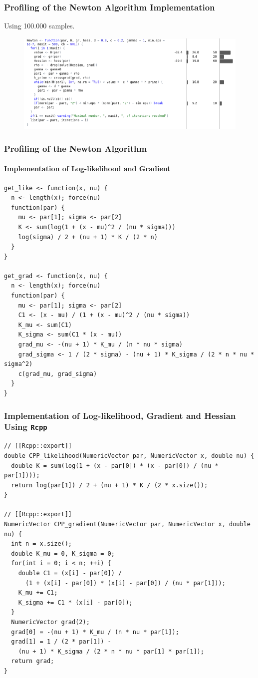 \documentclass[aspectratio=169]{beamer}
\begin{document}
\begin{frame}
    \frametitle{Profiling of the Newton Algorithm Implementation}
    Using 100.000 samples.
    \begin{figure}
        \centering
        \includegraphics[scale = 0.4]{figure/NewtonProfile.png}
    \end{figure}
\end{frame}
\begin{frame}[fragile]
    \frametitle{Profiling of the Newton Algorithm}
    \framesubtitle{Implementation of Log-likelihood and Gradient}
\begin{verbatim}
get_like <- function(x, nu) {
  n <- length(x); force(nu)
  function(par) {
    mu <- par[1]; sigma <- par[2]
    K <- sum(log(1 + (x - mu)^2 / (nu * sigma)))
    log(sigma) / 2 + (nu + 1) * K / (2 * n)
  }
}

get_grad <- function(x, nu) {
  n <- length(x); force(nu)
  function(par) {
    mu <- par[1]; sigma <- par[2]
    C1 <- (x - mu) / (1 + (x - mu)^2 / (nu * sigma))
    K_mu <- sum(C1)
    K_sigma <- sum(C1 * (x - mu))
    grad_mu <- -(nu + 1) * K_mu / (n * nu * sigma)
    grad_sigma <- 1 / (2 * sigma) - (nu + 1) * K_sigma / (2 * n * nu * sigma^2)
    c(grad_mu, grad_sigma)
  }
}
\end{verbatim}
\end{frame}
\begin{frame}[fragile]
    \frametitle{Implementation of Log-likelihood, Gradient and Hessian Using \texttt{Rcpp}}
\begin{verbatim}
// [[Rcpp::export]]
double CPP_likelihood(NumericVector par, NumericVector x, double nu) {
  double K = sum(log(1 + (x - par[0]) * (x - par[0]) / (nu * par[1])));
  return log(par[1]) / 2 + (nu + 1) * K / (2 * x.size());
}

// [[Rcpp::export]]
NumericVector CPP_gradient(NumericVector par, NumericVector x, double nu) {
  int n = x.size();
  double K_mu = 0, K_sigma = 0;
  for(int i = 0; i < n; ++i) {
    double C1 = (x[i] - par[0]) / 
      (1 + (x[i] - par[0]) * (x[i] - par[0]) / (nu * par[1]));
    K_mu += C1;
    K_sigma += C1 * (x[i] - par[0]);
  }
  NumericVector grad(2);
  grad[0] = -(nu + 1) * K_mu / (n * nu * par[1]);
  grad[1] = 1 / (2 * par[1]) - 
    (nu + 1) * K_sigma / (2 * n * nu * par[1] * par[1]);
  return grad;
}
\end{verbatim}
\end{frame}
\end{document}
